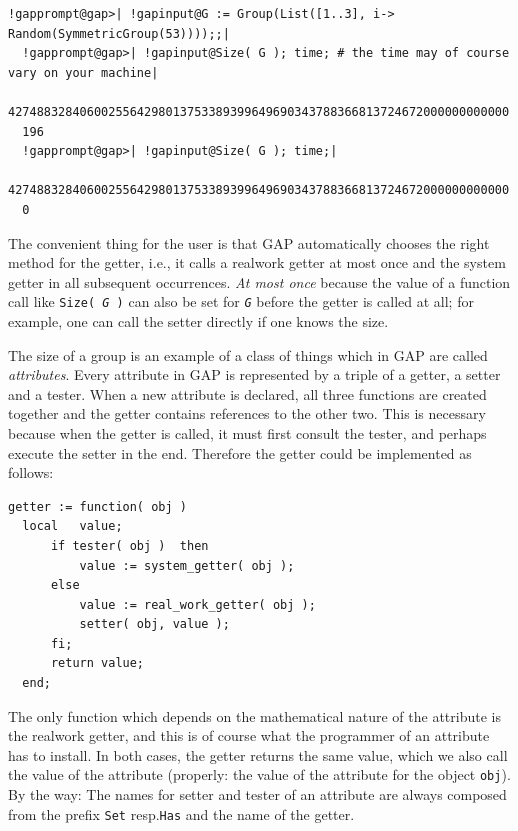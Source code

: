 \documentclass[a4paper,11pt]{report}
\begin{document}
{{ 
\begin{Verbatim}[commandchars=!@|,fontsize=\small,frame=single,label=Example]
  !gapprompt@gap>| !gapinput@G := Group(List([1..3], i-> Random(SymmetricGroup(53))));;|
  !gapprompt@gap>| !gapinput@Size( G ); time; # the time may of course vary on your machine|
  4274883284060025564298013753389399649690343788366813724672000000000000
  196
  !gapprompt@gap>| !gapinput@Size( G ); time;|
  4274883284060025564298013753389399649690343788366813724672000000000000
  0
\end{Verbatim}
 

 The convenient thing for the user is that \textsf{GAP} automatically chooses the right method for the getter, i.e., it calls a
real\texttt{}work getter at most once and the system getter in all
subsequent occurrences. \emph{At most once} because the value of a function call like \texttt{Size( \mbox{\texttt{\mdseries\slshape G}} )} can also be set for \mbox{\texttt{\mdseries\slshape G}} before the getter is called at all; for example, one can call the setter
directly if one knows the size. 

 The size of a group is an example of a class of things which in \textsf{GAP} are called \emph{attributes}. Every attribute in \textsf{GAP} is represented by a triple of a getter, a setter and a tester. When a new
attribute is declared, all three functions are created together and the getter
contains references to the other two. This is necessary because when the
getter is called, it must first consult the tester, and perhaps execute the
setter in the end. Therefore the getter could be implemented as follows: 
\begin{Verbatim}[commandchars=!@|,fontsize=\small,frame=single,label=Example]
  getter := function( obj )
  local   value;
      if tester( obj )  then
          value := system_getter( obj );
      else
          value := real_work_getter( obj );
          setter( obj, value );
      fi;
      return value;
  end;
\end{Verbatim}
 The only function which depends on the mathematical nature of the attribute is
the real\texttt{}work getter, and this is of course what the
programmer of an attribute has to install. In both cases, the getter returns
the same value, which we also call the value of the attribute (properly: the
value of the attribute for the object \texttt{obj}). By the way: The names for setter and tester of an attribute are always
composed from the prefix \texttt{Set} resp.{\nobreakspace}\texttt{Has} and the name of the getter. 

}}
\end{document}
